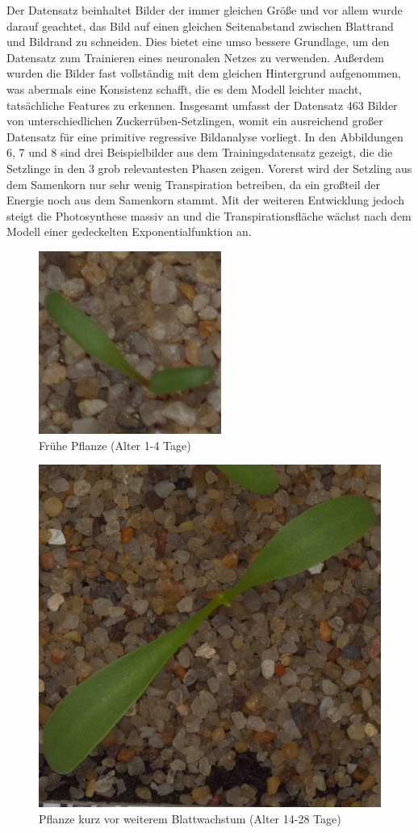 \newline \par
Der Datensatz beinhaltet Bilder der immer gleichen Größe und vor allem wurde darauf geachtet, das Bild auf einen gleichen Seitenabstand zwischen Blattrand und Bildrand zu schneiden. Dies bietet eine umso bessere Grundlage, um den Datensatz zum Trainieren eines neuronalen Netzes zu verwenden. Außerdem wurden die Bilder fast vollständig mit dem gleichen Hintergrund aufgenommen, was abermals eine Konsistenz schafft, die es dem Modell leichter macht, tatsächliche Features zu erkennen. Insgesamt umfasst der Datensatz 463 Bilder von unterschiedlichen Zuckerrüben-Setzlingen, womit ein ausreichend großer Datensatz für eine primitive regressive Bildanalyse vorliegt. In den Abbildungen 6, 7 und 8 sind drei Beispielbilder aus dem Trainingsdatensatz gezeigt, die die Setzlinge in den 3 grob relevantesten Phasen zeigen. Vorerst wird der Setzling aus dem Samenkorn nur sehr wenig Transpiration betreiben, da ein großteil der Energie noch aus dem Samenkorn stammt. Mit der weiteren Entwicklung jedoch steigt die Photosynthese massiv an und die Transpirationsfläche wächst nach dem Modell einer gedeckelten Exponentialfunktion an.
\begin{figure}
    \centering
    \includegraphics[width=0.6\linewidth]{4.png}
    \caption{Frühe Pflanze (Alter 1-4 Tage)}
    \label{fig:enter-label}
\end{figure}
\begin{figure}
    \centering
    \includegraphics[width=0.6\linewidth]{60.png}
    \caption{Pflanze kurz vor weiterem Blattwachstum (Alter 14-28 Tage)}
    \label{fig:enter-label}
\end{figure}

